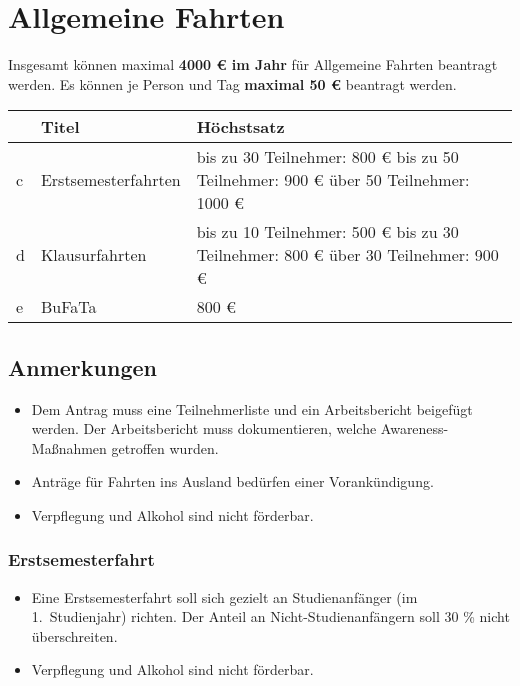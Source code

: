 \documentclass{article}
\begin{document}
\section{Allgemeine Fahrten}
    Insgesamt können maximal \textbf{4000 € im Jahr} für Allgemeine Fahrten beantragt werden. \newline
    Es können je Person und Tag \textbf{maximal 50 €} beantragt werden.\\
    
    \setlength\extrarowheight{2mm} \sffamily    
    \begin{tabular}{l||L{6cm}|L{7cm}}
    
    	&\textbf{Titel} &  \textbf{Höchstsatz}\\ \hline \hline
    	c &
    	Erstsemesterfahrten &
    	
    	bis zu 30 Teilnehmer: 800 € \newline
    	bis zu 50 Teilnehmer: 900 € \newline
    	über 50 Teilnehmer: 1000 €\\ \hline
    
    	d &
    	Klausurfahrten &
    	bis zu 10 Teilnehmer: 500 € \newline
    	bis zu 30 Teilnehmer: 800 € \newline
    	über 30 Teilnehmer: 900 €  \\ \hline
    	
    	e &
    	BuFaTa &
    	800 € \\
    \end{tabular}
    \rmfamily
    \subsection{Anmerkungen}
        \begin{itemize}
            \item Dem Antrag muss eine Teilnehmerliste und ein Arbeitsbericht beigefügt werden. 
            	Der Arbeitsbericht muss dokumentieren, welche Awareness-Maßnahmen getroffen wurden.
            \item Anträge für Fahrten ins Ausland bedürfen einer Vorankündigung.
            \item Verpflegung und Alkohol sind nicht förderbar.
        \end{itemize}
        \subsubsection{Erstsemesterfahrt}
            \begin{itemize}
                \item  Eine Erstsemesterfahrt soll sich gezielt an Studienanfänger (im 1.\ Studienjahr) richten. Der Anteil an Nicht-Studienanfängern soll 30 \% nicht überschreiten.
            \item Verpflegung und Alkohol sind nicht förderbar.
            \end{itemize}
\end{document}
